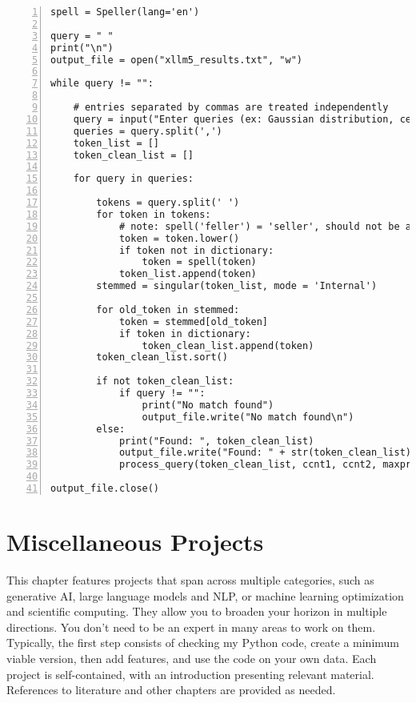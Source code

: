 \documentclass[oneside,10pt]{book}
\begin{document}
\begin{lstlisting}[numbers=left]
spell = Speller(lang='en')

query = " "
print("\n")
output_file = open("xllm5_results.txt", "w")

while query != "":  

    # entries separated by commas are treated independently
    query = input("Enter queries (ex: Gaussian distribution, central moments): ") 
    queries = query.split(',')
    token_list = []
    token_clean_list = []

    for query in queries:

        tokens = query.split(' ')
        for token in tokens:
            # note: spell('feller') = 'seller', should not be autocorrected
            token = token.lower()
            if token not in dictionary:
                token = spell(token) 
            token_list.append(token)
        stemmed = singular(token_list, mode = 'Internal')   

        for old_token in stemmed:
            token = stemmed[old_token]
            if token in dictionary:
                token_clean_list.append(token)
        token_clean_list.sort()

        if not token_clean_list: 
            if query != "":
                print("No match found")
                output_file.write("No match found\n")
        else:
            print("Found: ", token_clean_list) 
            output_file.write("Found: " + str(token_clean_list) + "\n") 
            process_query(token_clean_list, ccnt1, ccnt2, maxprint, output_file)

output_file.close()

\end{lstlisting}




\chapter{Miscellaneous Projects}

This chapter features projects that span across multiple categories, such as generative AI, large language models and NLP, or machine learning optimization and scientific computing. They allow you to broaden your horizon in multiple directions. You don't need to be an expert in many areas to work on them. 
 Typically,  the first step consists of checking my Python code, create a minimum viable version, then add features, and use the code on your own data. Each
 project is self-contained, with an introduction presenting relevant material. References to literature and other chapters are provided as needed.  
\end{document}
